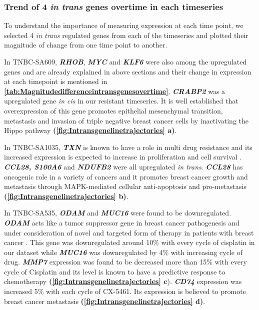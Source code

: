 
 \subsubsection{Trend of 4 \textit{in trans} genes overtime in each timeseries}

To understand the importance of measuring expression at each time point, we selected 4 \textit{in trans} regulated genes from each of the timeseries and plotted their magnitude of change from one time point to another.

In TNBC-SA609, \textit{\textbf{RHOB}}, \textit{\textbf{MYC}} and \textit{\textbf{KLF6}} were also among the upregulated genes and are already explained in above sections and their change in expression at each timepoint is mentioned in \textbf{\autoref{tab:Magnitudedifferenceintransgenesovertime}}.  \textit{\textbf{CRABP2}} was a upregulated gene \textit{in cis} in our resistant timeseries. It is well established that overexpression of this gene promotes epithelial mesenchymal transition, metastasis and invasion of triple negative breast cancer cells by inactivating the Hippo pathway \cite{feng2019crabp2} \textbf{(\autoref{fig:Intransgenelinetrajectories} a)}.

In TNBC-SA1035, \textit{\textbf{TXN}} is known to have a role in multi drug resistance and its increased expression is expected to increase in proliferation and cell survival \cite{mieszala2018expression, powis2000role}.
\textit{\textbf{CCL28, S100A6}} and \textit{\textbf{NDUFB2}} were all upregulated \textit{in trans}. \textit{\textbf{CCL28}} has oncogenic role in a variety of cancers and it promotes breast cancer growth and metastasis through MAPK-mediated cellular anti-apoptosis and pro-metastasis \cite{yang2017ccl28, lin2013ccl28} \textbf{(\autoref{fig:Intransgenelinetrajectories} b)}. 

In TNBC-SA535, \textit{\textbf{ODAM}} and \textit{\textbf{MUC16}} were found to be downregulated. \textit{\textbf{ODAM}} acts like a tumor suppressor gene in breast cancer pathogenesis and under consideration of novel and targeted form of therapy in patients with breast cancer  \cite{kestler2011odam, foster2013odontogenic}. This gene was downregulated around 10\% with every cycle of cisplatin in our dataset while \textit{\textbf{MUC16}} was downregulated by 4\% with increasing cycle of drug. \textit{\textbf{MMP7}} expression was found to be decreased more than 15\% with every cycle of Cisplatin and its level is known to have a predictive response to chemotherapy \cite{liu2008predictive} \textbf{(\autoref{fig:Intransgenelinetrajectories} c}).  \textit{\textbf{CD74}} expression was increased 5\% with each cycle of CX-5461. Its expression is believed to promote breast cancer metastasis \cite{otterstrom2014cd74, gai2018expression, wang2017cd74} \textbf{(\autoref{fig:Intransgenelinetrajectories} d)}.


